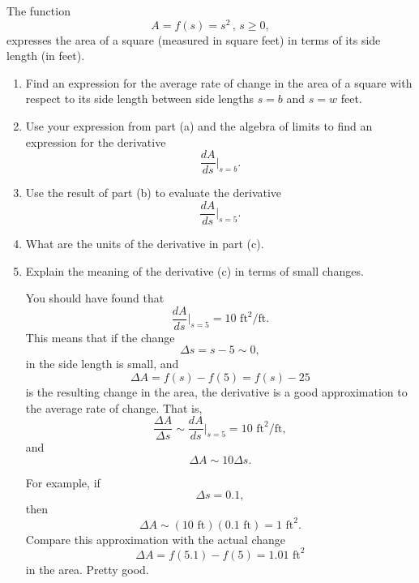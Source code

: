 \documentclass{ximera}
\begin{document}
\begin{question}  \label{QPodfoitte43}
The function
\[
         A = f(s) =s^2 \, , \, s\geq 0 ,
\]
expresses the area of a square (measured in square feet) in terms of its side length (in feet).

\begin{enumerate}
\item Find an expression for the average rate of change in the area of a square with respect to its side length between side lengths $s=b$ and $s=w$ feet.

\item Use your expression from part (a) and the algebra of limits to find an expression for the derivative
\[
      \frac{dA}{ds}\Big|_{s=b}.
\]

\item Use the result of part (b) to evaluate the derivative
\[
   \frac{dA}{ds}\Big|_{s=5}.
\]

\item What are the units of the derivative in part (c).

\item Explain the meaning of the derivative (c) in terms of small changes.

\begin{explanation}
You should have found that
\[
    \frac{dA}{ds}\Big|_{s=5} = 10 \text{ ft}^2/\text{ft} .
\]
This means that if the change
\[
    \Delta s = s-5 \sim 0,
\]
in the side length is small, and  
\[
   \Delta A = f(s) - f(5) = f(s)-25
\]
is the resulting change in the area, the derivative is a good approximation to the average rate of change. That is,
\[
  \frac{\Delta A}{\Delta s} \sim \frac{dA}{ds}\Big|_{s=5} = 10 \text{ ft}^2/\text{ft},
\]
and
\[
   \Delta A \sim 10 \Delta s. 
\]

For example, if 
\[
 \Delta s = 0.1 ,
\]
then 
\[
    \Delta A \sim (10 \text{ ft} ) (0.1 \text{ ft}) = 1 \text{ ft}^2.
\]
Compare this approximation with the actual change
\[
   \Delta A = f(5.1) - f(5) = 1.01 \text{ ft}^2
\]
in the area. Pretty good.
\end{explanation}

\end{enumerate}

\end{question}
\end{document}

